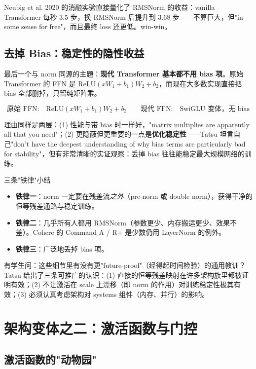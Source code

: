 \documentclass[a4paper]{article}
\begin{document}
Neubig et al. 2020 的消融实验直接量化了 RMSNorm 的收益：vanilla Transformer 每秒 3.5 步，换 RMSNorm 后提升到 3.68 步——不算巨大，但"in some sense for free"，而且最终 loss 还更低。win-win。

\subsection{去掉 Bias：稳定性的隐性收益}

最后一个与 norm 同源的主题：\textbf{现代 Transformer 基本都不用 bias 项}。原始 Transformer 的 FFN 是 $\mathrm{ReLU}(xW_1 + b_1)W_2 + b_2$，而现在大多数实现直接把 bias 全部删掉，只留纯矩阵乘。

\[
\text{原始 FFN:} \quad \mathrm{ReLU}(x W_1 + b_1) W_2 + b_2
\qquad
\text{现代 FFN:} \quad \mathrm{SwiGLU}\text{ 变体，无 bias}
\]

理由同样是两层：(1) 性能与带 bias 时一样好，"matrix multiplies are apparently all that you need"；(2) 更隐蔽但更重要的一点是\textbf{优化稳定性}——Tatsu 坦言自己"don't have the deepest understanding of why bias terms are particularly bad for stability"，但有非常清晰的实证观察：丢掉 bias 往往能稳定最大规模网络的训练。

\begin{practicebox}{三条"铁律"小结}
\begin{itemize}
    \item \textbf{铁律一}：norm 一定要在残差流\emph{之外}（pre-norm 或 double norm），获得干净的恒等残差通路与稳定训练。
    \item \textbf{铁律二}：几乎所有人都用 RMSNorm（参数更少、内存搬运更少、效果不差）。Cohere 的 Command A / R+ 是少数仍用 LayerNorm 的例外。
    \item \textbf{铁律三}：广泛地丢掉 bias 项。
\end{itemize}
\end{practicebox}

有学生问：这些细节里有没有更"future-proof"（经得起时间检验）的通用教训？Tatsu 给出了三条可推广的认识：(1) 直接的恒等残差映射在许多架构族里都被证明有效；(2) 不让激活在 scale 上漂移（即 norm 的作用）对训练稳定性极其有效；(3) 必须认真考虑架构对 systems 组件（内存、并行）的影响。

\section{架构变体之二：激活函数与门控}

\subsection{激活函数的"动物园"}
\end{document}
